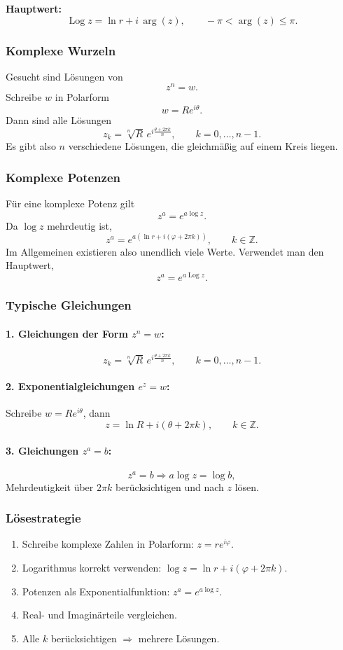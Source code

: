 \documentclass[10pt,a4paper,twocolumn]{article}
\begin{document}
	\textbf{Hauptwert:}
	\[
	\operatorname{Log}z = \ln r + i\,\arg(z), \qquad -\pi < \arg(z)\le \pi.
	\]
	
	
	\subsubsection{Komplexe Wurzeln}
	Gesucht sind Lösungen von
	\[
	z^n = w.
	\]
	Schreibe $w$ in Polarform
	\[
	w = Re^{i\theta}.
	\]
	Dann sind alle Lösungen
	\[
	z_k = \sqrt[n]{R}\, e^{i\frac{\theta + 2\pi k}{n}}, \qquad k=0,\dots,n-1.
	\]
	Es gibt also $n$ verschiedene Lösungen, die gleichmäßig auf einem Kreis liegen.
	
	
	\subsubsection{Komplexe Potenzen}
	Für eine komplexe Potenz gilt
	\[
	z^a = e^{a\log z}.
	\]
	Da $\log z$ mehrdeutig ist,
	\[
	z^a = e^{a(\ln r + i(\varphi + 2\pi k))}, \qquad k\in\mathbb{Z}.
	\]
	Im Allgemeinen existieren also unendlich viele Werte.
	Verwendet man den Hauptwert,
	\[
	z^a = e^{a\operatorname{Log}z}.
	\]
	
	
	\subsubsection{Typische Gleichungen}
	
	\paragraph{1. Gleichungen der Form $z^n = w$:}
	\[
	z_k = \sqrt[n]{R}\, e^{i\frac{\theta + 2\pi k}{n}}, \qquad k=0,\dots,n-1.
	\]
	
	\paragraph{2. Exponentialgleichungen $e^z = w$:}
	Schreibe $w = Re^{i\theta}$, dann
	\[
	z = \ln R + i(\theta + 2\pi k), \qquad k\in\mathbb{Z}.
	\]
	
	\paragraph{3. Gleichungen $z^a = b$:}
	\[
	z^a = b \Rightarrow a\log z = \log b,
	\]
	Mehrdeutigkeit über $2\pi k$ berücksichtigen und nach $z$ lösen.
	
	
	\subsubsection{Lösestrategie}
	\begin{enumerate}
		\item Schreibe komplexe Zahlen in Polarform: $z = re^{i\varphi}$.
		\item Logarithmus korrekt verwenden: $\log z = \ln r + i(\varphi + 2\pi k)$.
		\item Potenzen als Exponentialfunktion: $z^a = e^{a\log z}$.
		\item Real- und Imaginärteile vergleichen.
		\item Alle $k$ berücksichtigen $\Rightarrow$ mehrere Lösungen.
	\end{enumerate}
	
\end{document}
